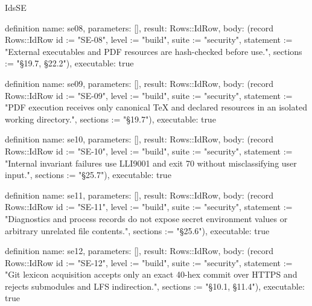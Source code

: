 \begin{lexlean}{IdsSE}
\begin{semanticmodule}
definition{
  name: se08,
  parameters: [],
  result: Rows::IdRow,
  body: (record Rows::IdRow {id := "SE-08", level := "build", suite := "security", statement := "External executables and PDF resources are hash-checked before use.", sections := "§19.7, §22.2"}),
  executable: true
}

definition{
  name: se09,
  parameters: [],
  result: Rows::IdRow,
  body: (record Rows::IdRow {id := "SE-09", level := "build", suite := "security", statement := "PDF execution receives only canonical TeX and declared resources in an isolated working directory.", sections := "§19.7"}),
  executable: true
}

definition{
  name: se10,
  parameters: [],
  result: Rows::IdRow,
  body: (record Rows::IdRow {id := "SE-10", level := "build", suite := "security", statement := "Internal invariant failures use LLI9001 and exit 70 without misclassifying user input.", sections := "§25.7"}),
  executable: true
}

definition{
  name: se11,
  parameters: [],
  result: Rows::IdRow,
  body: (record Rows::IdRow {id := "SE-11", level := "build", suite := "security", statement := "Diagnostics and process records do not expose secret environment values or arbitrary unrelated file contents.", sections := "§25.6"}),
  executable: true
}

definition{
  name: se12,
  parameters: [],
  result: Rows::IdRow,
  body: (record Rows::IdRow {id := "SE-12", level := "build", suite := "security", statement := "Git lexicon acquisition accepts only an exact 40-hex commit over HTTPS and rejects submodules and LFS indirection.", sections := "§10.1, §11.4"}),
  executable: true
}
\end{semanticmodule}
\end{lexlean}
